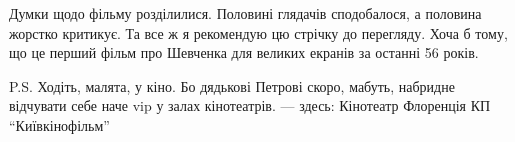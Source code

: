 Думки щодо фільму розділилися. Половині глядачів сподобалося, а половина
жорстко критикує. Та все ж я рекомендую цю стрічку до перегляду. Хоча б тому,
що це перший фільм про Шевченка для великих екранів за останні 56 років.

P.S. Ходіть, малята, у кіно. Бо дядькові Петрові скоро, мабуть, набридне
відчувати себе наче vip у залах кінотеатрів. — здесь: Кінотеатр Флоренція КП
``Київкінофільм''
